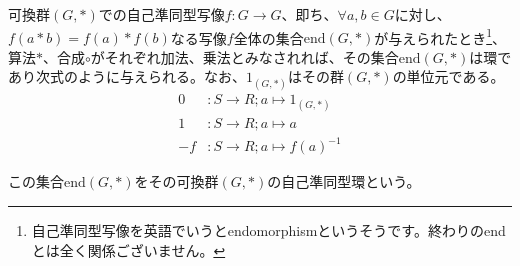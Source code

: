 \documentclass[dvipdfmx]{jsarticle}
\begin{document}
\begin{thm}\label{3.3.1.5}
可換群$(G,*)$での自己準同型写像$f:G \rightarrow G$、即ち、$\forall a,b \in G$に対し、$f(a*b) = f(a)*f(b)$なる写像$f$全体の集合$\mathrm{end}(G,*)$が与えられたとき\footnote{自己準同型写像を英語でいうとendomorphismというそうです。終わりのendとは全く関係ございません。}、算法$*$、合成$\circ$がそれぞれ加法、乗法とみなされれば、その集合$\mathrm{end}(G,*)$は環であり次式のように与えられる。なお、$1_{(G,*)}$はその群$(G,*)$の単位元である。
\begin{align*}
0&:S \rightarrow R;a \mapsto 1_{(G,*)}\\
1&:S \rightarrow R;a \mapsto a\\
- f&:S \rightarrow R;a \mapsto {f(a)}^{- 1}
\end{align*}
\end{thm}
\begin{dfn}
この集合$\mathrm{end}(G,*)$をその可換群$(G,*)$の自己準同型環という。
\end{dfn}
\end{document}
